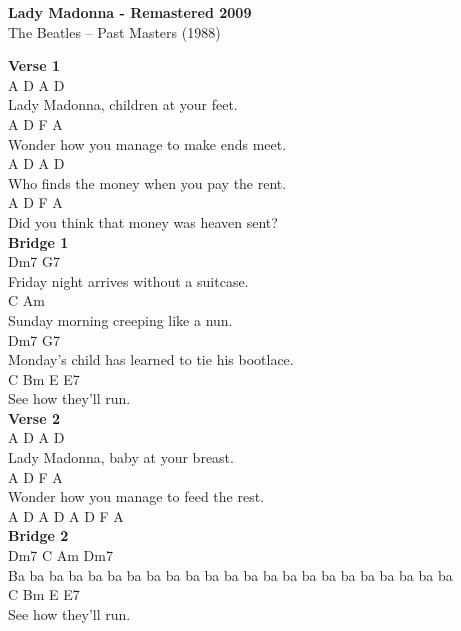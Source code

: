 \documentclass[a4paper]{article}
\begin{document}
    \begin{center}
        \textbf{Lady Madonna - Remastered 2009}
        ~\\
        The Beatles -- Past Masters (1988)
    \end{center}
    {
        \scriptsize
        \textbf{Verse 1}
        ~\\
        {
            \cutive
            \obeyspaces
A      D      A                D
\\
Lady Madonna, children at your feet.
\\
A              D         F         A
\\
Wonder how you manage to make ends meet.
\\
A             D     A                D
\\
Who finds the money when you pay the rent.
\\
A                  D         F      A
\\
Did you think that money was heaven sent?
\\

        }
        \textbf{Bridge 1}
        ~\\
        {
            \cutive
            \obeyspaces
Dm7                            G7
\\
Friday night arrives without a suitcase.
\\
C                              Am
\\
Sunday morning creeping like a nun.
\\
Dm7                                   G7
\\
Monday's child has learned to tie his bootlace.
\\
C   Bm          E  E7
\\
See how they'll run.
\\

        }
        \textbf{Verse 2}
        ~\\
        {
            \cutive
            \obeyspaces
A      D      A            D
\\
Lady Madonna, baby at your breast.
\\
A              D         F        A
\\
Wonder how you manage to feed the rest.
\\
A D  A D  A D F A
\\

        }
        \textbf{Bridge 2}
        ~\\
        {
            \cutive
            \obeyspaces
Dm7                   C              Am         Dm7
\\
Ba ba ba ba ba ba ba  ba ba ba ba ba ba ba ba   ba ba ba ba ba ba ba ba
\\
C   Bm          E  E7
\\
See how they'll run.
\\

}}
\end{document}
